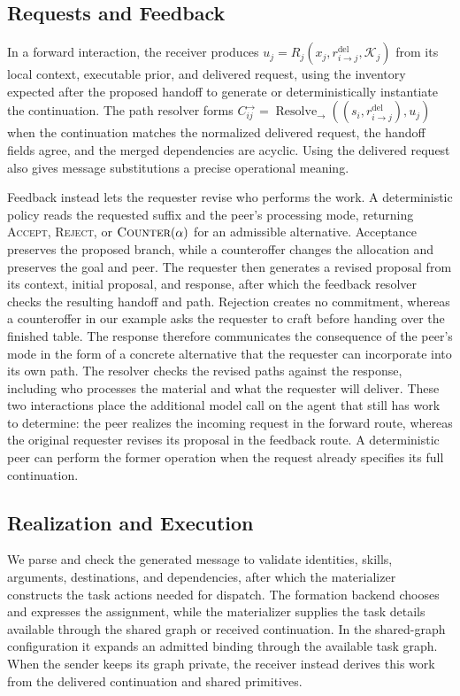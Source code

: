 \documentclass[sigconf,nonacm,balance=false]{aamas}
\begin{document}
\subsection{Requests and Feedback}
\label{sec:resolution}
In a forward interaction, the receiver produces \mbox{$u_j=R_j(x_j,r^{\mathrm{del}}_{i\rightarrow j},\mathcal K_j)$} from its local context, executable prior, and delivered request, using the inventory expected after the proposed handoff to generate or deterministically instantiate the continuation. The path resolver forms \mbox{$C^{\rightarrow}_{ij}=\operatorname{Resolve}_{\rightarrow}((s_i,r^{\mathrm{del}}_{i\rightarrow j}),u_j)$} when the continuation matches the normalized delivered request, the handoff fields agree, and the merged dependencies are acyclic. Using the delivered request also gives message substitutions a precise operational meaning.

Feedback instead lets the requester revise who performs the work. A deterministic policy reads the requested suffix and the peer's processing mode, returning \textsc{Accept}, \textsc{Reject}, or $\textsc{Counter}(\alpha)$ for an admissible alternative. Acceptance preserves the proposed branch, while a counteroffer changes the allocation and preserves the goal and peer. The requester then generates a revised proposal from its context, initial proposal, and response, after which the feedback resolver checks the resulting handoff and path. Rejection creates no commitment, whereas a counteroffer in our example asks the requester to craft before handing over the finished table. The response therefore communicates the consequence of the peer's mode in the form of a concrete alternative that the requester can incorporate into its own path. The resolver checks the revised paths against the response, including who processes the material and what the requester will deliver. These two interactions place the additional model call on the agent that still has work to determine: the peer realizes the incoming request in the forward route, whereas the original requester revises its proposal in the feedback route. A deterministic peer can perform the former operation when the request already specifies its full continuation.

\subsection{Realization and Execution}
We parse and check the generated message to validate identities, skills, arguments, destinations, and dependencies, after which the materializer constructs the task actions needed for dispatch. The formation backend chooses and expresses the assignment, while the materializer supplies the task details available through the shared graph or received continuation. In the shared-graph configuration it expands an admitted binding through the available task graph. When the sender keeps its graph private, the receiver instead derives this work from the delivered continuation and shared primitives.
\end{document}
